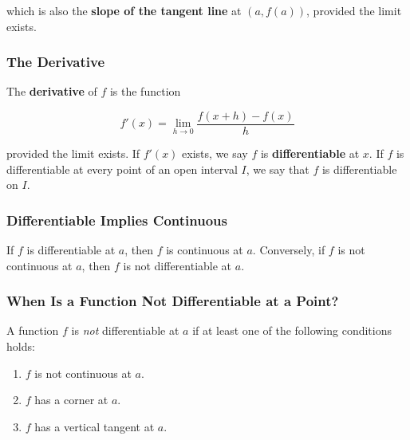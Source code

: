 which is also the \textbf{slope of the tangent line} at $(a, f(a))$, provided the limit exists.

\subsubsection{The Derivative}
The \textbf{derivative} of $f$ is the function

\begin{equation}
    f'(x) = \lim_{h \rightarrow 0} \frac{f(x + h) - f(x)}{h}
\end{equation}

provided the limit exists. If $f'(x)$ exists, we say $f$ is \textbf{differentiable} at $x$. If $f$ is differentiable at every point of an open interval $I$, we say that $f$ is differentiable on $I$.

\subsubsection{Differentiable Implies Continuous}
If $f$ is differentiable at $a$, then $f$ is continuous at $a$. Conversely, if $f$ is not continuous at $a$, then $f$ is not differentiable at $a$.

\subsubsection{When Is a Function Not Differentiable at a Point?}
A function $f$ is \textit{not} differentiable at $a$ if at least one of the following conditions holds:

\begin{enumerate}
    \item $f$ is not continuous at $a$.
    \item $f$ has a corner at $a$.
    \item $f$ has a vertical tangent at $a$.
\end{enumerate}
